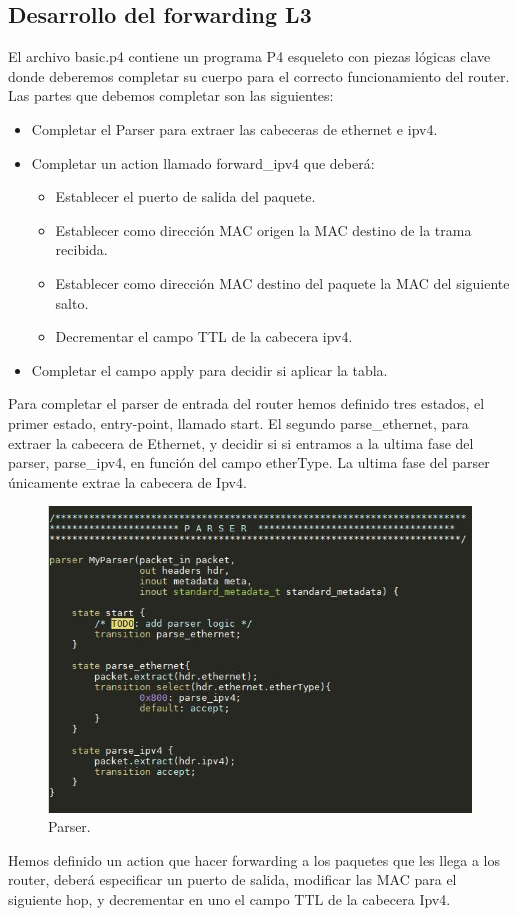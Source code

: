 \subsection{Desarrollo del forwarding L3}
El archivo basic.p4 contiene un programa P4 esqueleto con piezas lógicas clave donde deberemos completar su cuerpo para el correcto funcionamiento del router. Las partes que debemos completar son las siguientes:
\begin{itemize}
    \item Completar el Parser para extraer las cabeceras de ethernet e ipv4.
    \item Completar un action llamado forward\_ipv4 que deberá: 
        \begin{itemize}
            \item Establecer el puerto de salida del paquete. 
            \item Establecer como dirección MAC origen la MAC destino de la trama recibida. 
            \item Establecer como dirección MAC destino del paquete la MAC del siguiente salto.
            \item Decrementar el campo TTL de la cabecera ipv4.
        \end{itemize}
    
    \item Completar el campo apply para decidir si aplicar la tabla.
\end{itemize}
\newpage
Para completar el parser de entrada del router hemos definido tres estados, el primer estado, entry-point, llamado start. El segundo parse\_ethernet, para extraer la cabecera de Ethernet, y decidir si si entramos a la ultima fase del parser, parse\_ipv4, en función del campo etherType. La ultima fase del parser únicamente extrae la cabecera de Ipv4. 
\begin{figure}[!htb]
  \centering
    \includegraphics[width=0.8\linewidth]{./img/test/2.JPG}
    \caption{Parser.}
  \label{fig:yo}
\end{figure}
\newline
Hemos definido un action que hacer forwarding a los paquetes que les llega a los router, deberá especificar un puerto de salida, modificar las MAC para el siguiente hop, y decrementar en uno el campo TTL de la cabecera Ipv4. \newline

